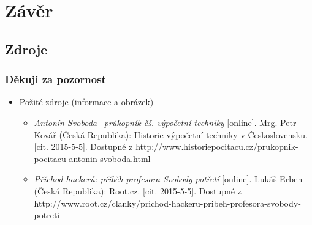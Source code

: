 \documentclass{beamer}
\begin{document}
\section{Závěr}
\subsection{Zdroje}
    \begin{frame}
        \frametitle{Děkuji za pozornost}
        \begin{itemize}
            \item Požité zdroje (informace a obrázek)
                \begin{itemize}
                    \item \textit{Antonín Svoboda\,--\,průkopník čš. výpočetní techniky} [online]. Mrg. Petr Kovář (Česká Republika): Historie výpočetní techniky v Československu. [cit. 2015-5-5]. Dostupné z http://www.historiepocitacu.cz/prukopnik-pocitacu-antonin-svoboda.html
                    \item \textit{Příchod hackerů: příběh profesora Svobody potřetí} [online]. Lukáš Erben (Česká Republika): Root.cz. [cit. 2015-5-5]. Dostupné z http://www.root.cz/clanky/prichod-hackeru-pribeh-profesora-svobody-potreti
                \end{itemize}
        \end{itemize}
    \end{frame}
\end{document}
